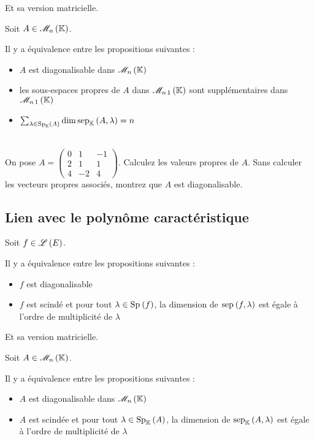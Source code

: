 Et sa version matricielle.

\begin{theo}
Soit \(A\in\M{n}\).

Il y a équivalence entre les propositions suivantes :

\begin{itemize}
    \item \(A\) est diagonalisable dans \(\M{n}\) \\
    \item les sous-espaces propres de \(A\) dans \(\M{n\,1}\) sont supplémentaires dans \(\M{n\,1}\) \\
    \item \(\sum_{\lambda\in\Sp[\K]{A}}\dim\sep[\K]{A}{\lambda}=n\)
\end{itemize}
\end{theo}

\begin{exo}~\\
On pose \(A=\begin{pmatrix}
0 & 1 & -1 \\
2 & 1 & 1 \\
4 & -2 & 4
\end{pmatrix}\). Calculez les valeurs propres de \(A\). Sans calculer les vecteurs propres associés, montrez que \(A\) est diagonalisable.
\end{exo}

\subsection{Lien avec le polynôme caractéristique}

\begin{theo}
Soit \(f\in\mathscr{L}\left(E\right)\).

Il y a équivalence entre les propositions suivantes :

\begin{itemize}
    \item \(f\) est diagonalisable \\
    \item \(f\) est scindé et pour tout \(\lambda\in\Sp{f}\), la dimension de \(\sep{f}{\lambda}\) est égale à l'ordre de multiplicité de \(\lambda\)
\end{itemize}
\end{theo}

Et sa version matricielle.

\begin{theo}
Soit \(A\in\M{n}\).

Il y a équivalence entre les propositions suivantes :

\begin{itemize}
    \item \(A\) est diagonalisable dans \(\M{n}\) \\
    \item \(A\) est scindée et pour tout \(\lambda\in\Sp[\K]{A}\), la dimension de \(\sep[\K]{A}{\lambda}\) est égale à l'ordre de multiplicité de \(\lambda\)
\end{itemize}
\end{theo}

